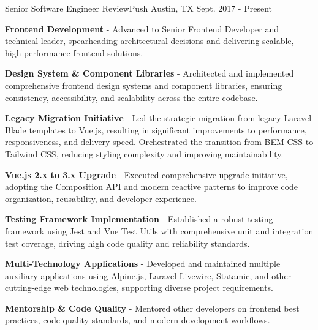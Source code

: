\begin{cventries}
    \cventry
    {Senior Software Engineer} %
    {ReviewPush} %
    {Austin, TX} %
    {Sept. 2017 - Present} %
    {
        \vspace{-4mm}
        \begin{cvitems} %
            \item {\textbf{Frontend Development} - Advanced to Senior Frontend Developer and technical leader, spearheading architectural decisions and delivering scalable, high-performance frontend solutions.}
        \end{cvitems}
        \begin{cvsubitems}
            \item {\textbf{Design System \& Component Libraries} - Architected and implemented comprehensive frontend design systems and component libraries, ensuring consistency, accessibility, and scalability across the entire codebase.}
            \item {\textbf{Legacy Migration Initiative} - Led the strategic migration from legacy Laravel Blade templates to Vue.js, resulting in significant improvements to performance, responsiveness, and delivery speed. Orchestrated the transition from BEM CSS to Tailwind CSS, reducing styling complexity and improving maintainability.}
            \item {\textbf{Vue.js 2.x to 3.x Upgrade} - Executed comprehensive upgrade initiative, adopting the Composition API and modern reactive patterns to improve code organization, reusability, and developer experience.}
            \item {\textbf{Testing Framework Implementation} - Established a robust testing framework using Jest and Vue Test Utils with comprehensive unit and integration test coverage, driving high code quality and reliability standards.}
            \item {\textbf{Multi-Technology Applications} - Developed and maintained multiple auxiliary applications using Alpine.js, Laravel Livewire, Statamic, and other cutting-edge web technologies, supporting diverse project requirements.}
            \item {\textbf{Mentorship \& Code Quality} - Mentored other developers on frontend best practices, code quality standards, and modern development workflows.}
        \end{cvsubitems}
        \begin{cvitems} %

\end{cvitems}}
\end{cventries}
